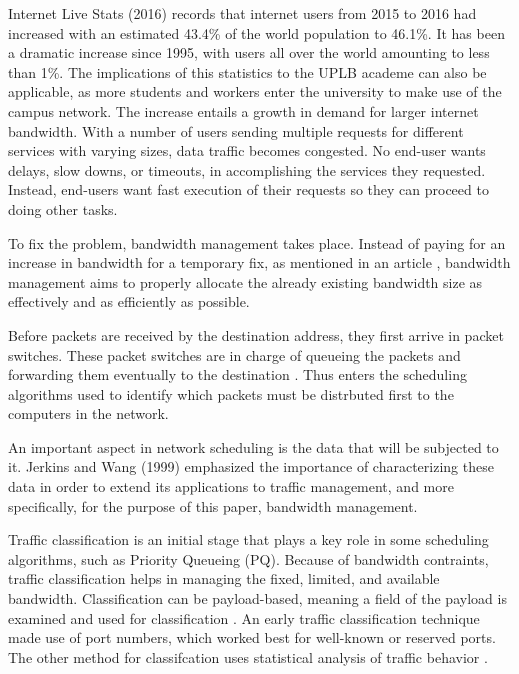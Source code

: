 \documentclass[journal]{IEEE/IEEEtran}
\begin{document}
Internet Live Stats (2016)\cite{internet_live_stats_2016} records that internet users from 2015 to 2016 had increased with an estimated 43.4\% of the world population to 46.1\%. It has been a dramatic increase since 1995, with users all over the world amounting to less than 1\%. The implications of this statistics to the UPLB academe can also be applicable, as more students and workers enter the university to make use of the campus network. The increase entails a growth in demand for larger internet bandwidth. With a number of users sending multiple requests for different services with varying sizes, data traffic becomes congested. No end-user wants delays, slow downs, or timeouts, in accomplishing the services they requested. Instead, end-users want fast execution of their requests so they can proceed to doing other tasks.

To fix the problem, bandwidth management takes place. Instead of paying for an increase in bandwidth for a temporary fix, as mentioned in an article \cite{communication_news_2001}, bandwidth management aims to properly allocate the already existing bandwidth size as effectively and as efficiently as possible.

Before packets are received by the destination address, they first arrive in packet switches. These packet switches are in charge of queueing the packets and forwarding them eventually to the destination \cite{comer_1999}. Thus enters the scheduling algorithms used to identify which packets must be distrbuted first to the computers in the network.

An important aspect in network scheduling is the data that will be subjected to it. Jerkins and Wang (1999) \cite{jerkin_wang_1999} emphasized the importance of characterizing these data in order to extend its applications to traffic management, and more specifically, for the purpose of this paper, bandwidth management.

Traffic classification is an initial stage that plays a key role in some scheduling algorithms, such as Priority Queueing (PQ). Because of bandwidth contraints, traffic classification helps in managing the fixed, limited, and available bandwidth. Classification can be payload-based, meaning a field of the payload is examined and used for classification \cite[Chapter~5]{cisco_2008}. An early traffic classification technique \cite{schneider_1996} made use of port numbers, which worked best for well-known or reserved ports. The other method for classifcation uses statistical analysis of traffic behavior \cite[Chapter~5]{cisco_2008}.
\end{document}
